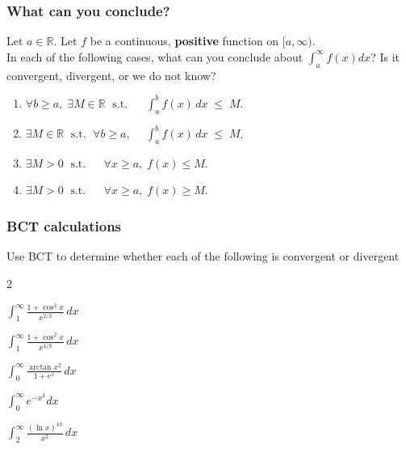 \documentclass[14pt]{beamer}
\begin{document}
\begin{frame}[t]
	\fontsize{13}{13}\selectfont
	\frametitle{What can you conclude?}

	Let $a \in \mathbb{R}$. Let $f$ be a continuous, {\bfseries positive} function
	on $[a, \infty)$. \\ In each of the following cases, what can you conclude about
	$\displaystyle \int_{a}^{\infty}f(x) dx$? \; Is it convergent, divergent, or
	we do not know?

	\begin{enumerate}
		\item $\displaystyle \forall b \geq a, \; \exists M \in \mathbb{R}\; \text{ s.t.
			}\; \quad \int_{a}^{b}f(x)\,dx \; \leq \; M$.

		\item $\displaystyle \exists M \in \mathbb{R}\; \text{ s.t. }\; \forall b \geq
			a, \; \quad \int_{a}^{b}f(x)\, dx \; \leq \; M$.
			\vspace{.3cm}

		\item $\displaystyle \exists M >0 \; \text{ s.t. }\; \quad \forall x \geq a,
			\; f(x) \leq M$.
			\vspace{.3cm}

		\item $\displaystyle \exists M >0 \; \text{ s.t. }\; \quad \forall x \geq a,
			\; f(x) \geq M$.
	\end{enumerate}
\end{frame}

\begin{frame}[t]
	\frametitle{BCT calculations}

	Use BCT to determine whether each of the following is convergent or divergent

	\begin{enumerate}
	\end{enumerate}
\end{frame}
\end{document}
